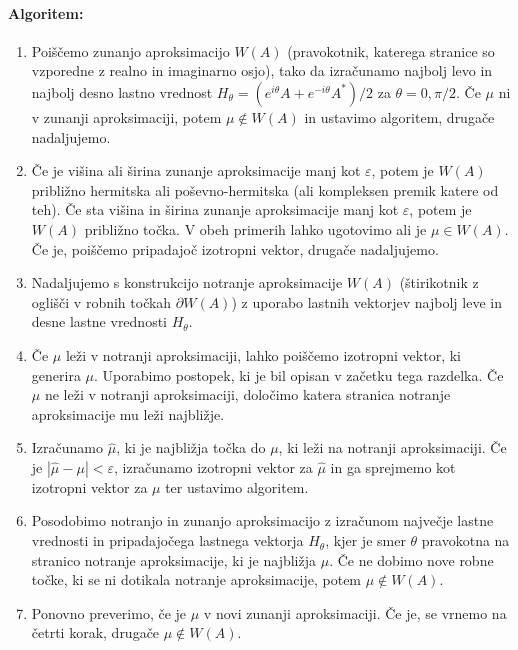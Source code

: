 \documentclass[12pt,a4paper]{amsart}
\theoremstyle{definition}
\theoremstyle{plain}
\newcommand{\abs}[1]{ \left\lvert#1\right\rvert}
\begin{document}
\paragraph{Algoritem:}
\begin{enumerate}[1.]
\item Poiščemo zunanjo aproksimacijo $W(A)$ (pravokotnik, katerega stranice so vzporedne z realno in imaginarno osjo), tako da izračunamo najbolj levo in najbolj desno lastno vrednost $H_\theta =(e^{i\theta}A+e^{-i\theta}A^\ast)/2$ za $\theta =0, \pi/2$. %
Če $\mu$ ni v zunanji aproksimaciji, potem $\mu \not \in W(A)$ in ustavimo algoritem, drugače nadaljujemo.
\item Če je višina ali širina zunanje aproksimacije manj kot $\varepsilon$, potem je $W(A)$ približno hermitska ali poševno-hermitska (ali kompleksen premik katere od teh). Če sta višina in širina zunanje aproksimacije manj kot $\varepsilon$, potem je $W(A)$ približno točka. V obeh primerih lahko ugotovimo ali je $\mu \in W(A)$. Če je, poiščemo pripadajoč izotropni vektor, drugače nadaljujemo.
\item Nadaljujemo s konstrukcijo notranje aproksimacije $W(A)$ (štirikotnik z og\-liš\-či v robnih točkah $\partial W(A)$) z uporabo lastnih vektorjev najbolj leve in desne lastne vrednosti $H_{\theta}$.%
\item  Če $\mu$ leži v notranji aproksimaciji, lahko poiščemo izotropni vektor, ki generira $\mu$. Uporabimo postopek, ki je bil opisan v začetku tega razdelka. %
Če $\mu$ ne leži v notranji aproksimaciji, določimo katera stranica notranje aproksimacije mu leži najbližje.
\item  Izračunamo $\hat{\mu}$, ki je najbližja točka do $\mu$, ki leži na notranji aproksimaciji. Če je $\abs{\hat{\mu}-\mu}<\varepsilon$, izračunamo izotropni vektor za $\hat{\mu}$ in ga sprejmemo kot izotropni vektor za $\mu$ ter ustavimo algoritem.
\item Posodobimo notranjo in zunanjo aproksimacijo z izračunom največje lastne vrednosti in pripadajočega lastnega vektorja $H_{\theta}$, kjer je smer $\theta$ pravokotna na stranico notranje aproksimacije, ki je najbližja $\mu$. Če ne dobimo nove robne točke, ki se ni dotikala notranje aproksimacije, potem $\mu \not \in W(A)$. 
\item Ponovno preverimo, če je $\mu$  v novi zunanji aproksimaciji. Če je, se vrnemo na četrti korak, drugače $\mu \not \in W(A)$. 
\end{enumerate}
\end{document}
